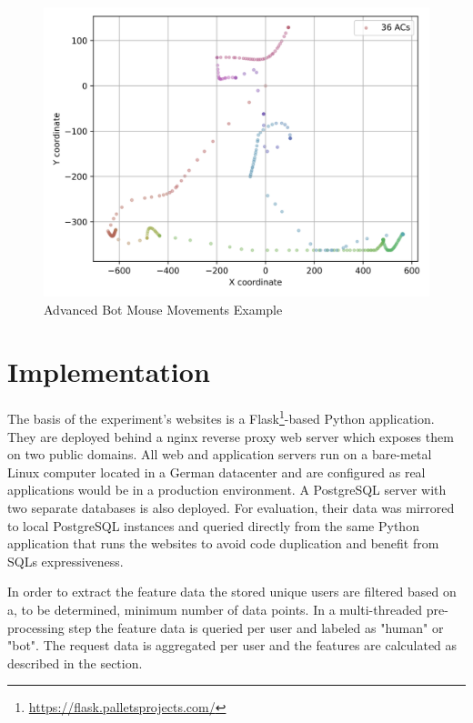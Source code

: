 \documentclass[
    fontsize=12pt,
    headings=small,
    parskip=half,           %
    bibliography=totoc,
    numbers=noenddot,       %
    open=any,               %
    final,                   %
    table
]{scrreprt}
\begin{document}
\begin{figure}[h]
    \includegraphics[width=\textwidth]{figures/bot_mouse_heatmap.png}
    \caption{Advanced Bot Mouse Movements Example}
    \label{fig:bot_mouse_heatmap}
\end{figure}



\section{Implementation}

The basis of the experiment's websites is a Flask\footnote{\url{https://flask.palletsprojects.com/}}-based Python application. They are deployed behind a nginx reverse proxy web server which exposes them on two public domains. All web and application servers run on a bare-metal Linux computer located in a German datacenter and are configured as real applications would be in a production environment. A PostgreSQL server with two separate databases is also deployed. For evaluation, their data was mirrored to local PostgreSQL instances and queried directly from the same Python application that runs the websites to avoid code duplication and benefit from SQLs expressiveness.

In order to extract the feature data the stored unique users are filtered based on a, to be determined, minimum number of data points. In a multi-threaded pre-processing step the feature data is queried per user and labeled as "human" or "bot". The request data is aggregated per user and the features are calculated as described in the  section.
\end{document}
